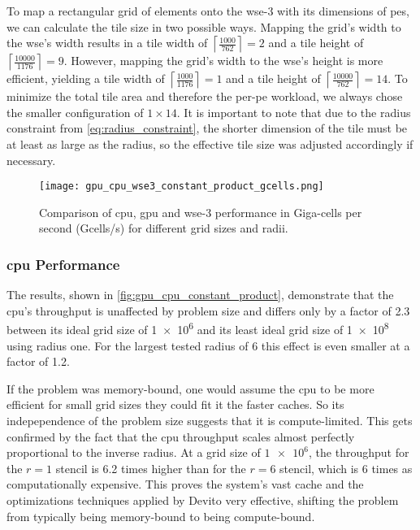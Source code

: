 To map a rectangular grid of  elements onto the \ac{wse}-3 with its dimensions of  \acp{pe}, we can calculate the tile size in two possible ways. Mapping the grid's width to the \ac{wse}'s width results in a tile width of $\left\lceil \frac{1000}{762} \right\rceil = 2$ and a tile height of $\left\lceil \frac{10000}{1176} \right\rceil = 9$. However, mapping the grid's width to the \ac{wse}'s height is more efficient, yielding a tile width of $\left\lceil \frac{1000}{1176} \right\rceil = 1$ and a tile height of $\left\lceil \frac{10000}{762} \right\rceil = 14$. To minimize the total tile area and therefore the per-\ac{pe} workload, we always chose the smaller configuration of $1 \times 14$. It is important to note that due to the radius constraint from \autoref{eq:radius_constraint}, the shorter dimension of the tile must be at least as large as the radius, so the effective tile size was adjusted accordingly if necessary.

\begin{figure}[h]
    \centering
    \texttt{[image: gpu\_cpu\_wse3\_constant\_product\_gcells.png]}
    \caption{Comparison of \ac{cpu}, \ac{gpu} and \ac{wse}-3 performance in Giga-cells per second (Gcells/s) for different grid sizes and radii.}
    \label{fig:gpu_cpu_constant_product}
\end{figure}

\subsubsection{\ac{cpu} Performance}
The results, shown in \autoref{fig:gpu_cpu_constant_product}, demonstrate that the \ac{cpu}'s throughput is unaffected by problem size and differs only by a factor of \num{2.3} between its ideal grid size of \num{1e6} and its least ideal grid size of \num{1e8} using radius one. For the largest tested radius of \num{6} this effect is even smaller at a factor of \num{1.2}.

If the problem was memory-bound, one would assume the \ac{cpu} to be more efficient for small grid sizes they could fit it the faster caches. So its indepependence of the problem size suggests that it is compute-limited.
This gets confirmed by the fact that the \ac{cpu} throughput scales almost perfectly proportional to the inverse radius.
At a grid size of $\num{1e6}$, the throughput for the $r=1$ stencil is \num{6.2} times higher than for the $r=6$ stencil, which is \num{6} times as computationally expensive. This proves the system's vast cache and the optimizations techniques applied by Devito very effective, shifting the problem from typically being memory-bound to being compute-bound. 

